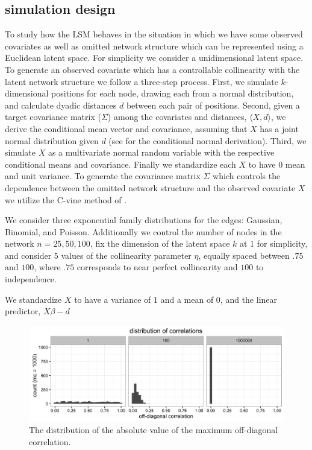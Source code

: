 \documentclass[12pt]{article}
\begin{document}
\subsection{simulation design}

To study how the LSM behaves in the situation in which we have some observed covariates as well as omitted network structure which can be represented using a Euclidean latent space. For simplicity we consider a unidimensional latent space. To generate an observed covariate which has a controllable collinearity with the latent network structure we follow a three-step process. First, we simulate $k$-dimensional positions for each node, drawing each from a normal distribution, and calculate dyadic distances $d$ between each pair of positions. Second, given a target covariance matrix ($\Sigma$) among the covariates and distances, $\langle X,d \rangle$, we derive the conditional mean vector and covariance, assuming that $X$ has a joint normal distribution given $d$ (see \cite[pp. 116--117]{eaton1983} for the conditional normal derivation). Third, we simulate $X$ as a multivariate normal random variable with the respective conditional means and covariance. Finally we standardize each $X$ to have 0 mean and unit variance. To generate the covariance matrix $\Sigma$ which controls the dependence between the omitted network structure and the observed covariate $X$ we utilize the C-vine method of \cite{lewandowski2009generating}. %

We consider three exponential family distributions for the edges: Gaussian, Binomial, and Poisson. Additionally we control the number of nodes in the network $n = 25, 50, 100$, fix the dimension of the latent space $k$ at 1 for simplicity, and consider 5 values of the collinearity parameter $\eta$, equally spaced between $.75$ and $100$, where $.75$ corresponds to near perfect collinearity and $100$ to independence.

We standardize $X$ to have a variance of $1$ and a mean of $0$, and the linear predictor, $X \beta - d$

\begin{figure}
\includegraphics[width=\textwidth]{max_r_vine.png}
\caption{The distribution of the absolute value of the maximum off-diagonal correlation.}
\end{figure}
\end{document}
